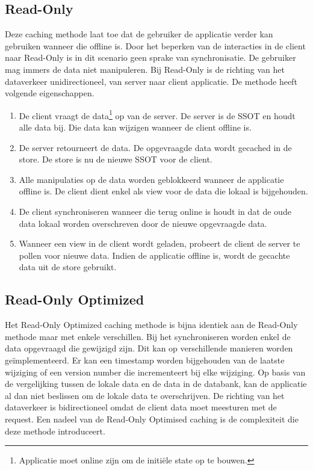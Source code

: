 \subsection{Read-Only}
Deze caching methode laat toe dat de gebruiker de applicatie verder kan gebruiken wanneer die offline is. Door het beperken van de interacties in de client naar Read-Only is in dit scenario geen sprake van synchronisatie. De gebruiker mag immers de data niet manipuleren. Bij Read-Only is de richting van het dataverkeer unidirectioneel, van server naar client applicatie. De methode heeft volgende eigenschappen.
\begin{enumerate}
\item De client vraagt de data\footnote{Applicatie moet online zijn om de initi\"ele state op te bouwen.} op van de server. De server is de SSOT en houdt alle data bij. Die data kan wijzigen wanneer de client offline is.
\item De server retourneert de data. De opgevraagde data wordt gecached in de store. De store is nu de nieuwe SSOT voor de client.
\item Alle manipulaties op de data worden geblokkeerd wanneer de applicatie offline is. De client dient enkel als view voor de data die lokaal is bijgehouden.
\item De client synchroniseren wanneer die terug online is houdt in dat de oude data lokaal worden overschreven door de nieuwe opgevraagde data.
\item Wanneer een view in de client wordt geladen, probeert de client de server te pollen voor nieuwe data. Indien de applicatie offline is, wordt de gecachte data uit de store gebruikt.
\end{enumerate}

\subsection{Read-Only Optimized}
Het Read-Only Optimized caching methode is  bijna identiek aan de Read-Only methode maar met enkele verschillen. Bij het synchroniseren worden enkel de data opgevraagd die gewijzigd zijn. Dit kan op verschillende manieren worden ge\"implementeerd. Er kan een timestamp worden bijgehouden van de laatste wijziging of een version number die incrementeert bij elke wijziging. Op basis van de vergelijking tussen de lokale data en de data in de databank, kan de applicatie al dan niet beslissen om de lokale data te overschrijven. De richting van het dataverkeer is bidirectioneel omdat de client data moet meesturen met de request. Een nadeel van de Read-Only Optimised caching is de complexiteit die deze methode introduceert.

